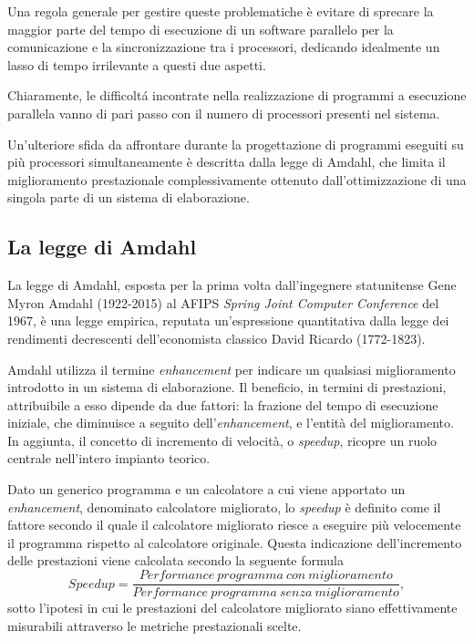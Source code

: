 Una regola generale per gestire queste problematiche \`e evitare di sprecare la maggior parte del tempo di esecuzione di un software parallelo
per la comunicazione e la sincronizzazione tra i processori, dedicando idealmente un lasso di tempo irrilevante a questi due aspetti.

Chiaramente, le difficolt\'a incontrate nella realizzazione di programmi a esecuzione parallela vanno di pari passo con il numero
di processori presenti nel sistema.

Un'ulteriore sfida da affrontare durante la progettazione di programmi eseguiti su pi\`u processori simultaneamente \`e descritta dalla legge di
Amdahl, che limita il miglioramento prestazionale complessivamente ottenuto dall'ottimizzazione di una singola parte di un sistema di
elaborazione.
\subsection{La legge di Amdahl}
La legge di Amdahl, esposta per la prima volta dall’ingegnere statunitense Gene Myron Amdahl (1922-2015) al AFIPS \textit{Spring Joint Computer
    Conference} del 1967, \`e una legge empirica, reputata un'espressione quantitativa dalla legge dei rendimenti decrescenti dell’economista classico David Ricardo (1772-1823).

Amdahl utilizza il termine \textit{enhancement} per indicare un qualsiasi miglioramento introdotto in un sistema di
elaborazione.\newline
Il beneficio, in termini di prestazioni, attribuibile a esso dipende da due fattori: la frazione del tempo di esecuzione iniziale,
che diminuisce a seguito dell'\textit{enhancement}, e l'entit\`a del miglioramento.\newline
In aggiunta, il concetto di incremento di velocit\`a, o \textit{speedup}, ricopre un ruolo centrale nell'intero impianto teorico.

Dato un generico programma e un calcolatore a cui viene apportato un \textit{enhancement}, denominato calcolatore migliorato,
lo \textit{speedup} \`e definito come il fattore secondo il quale il calcolatore migliorato riesce a eseguire pi\`u
velocemente il programma rispetto al calcolatore originale.\newline
Questa indicazione dell'incremento delle prestazioni viene calcolata secondo la seguente formula
\begin{equation*}
    Speedup=\frac{Performance\ programma\ con\ miglioramento}{Performance\ programma\ senza\ miglioramento},
\end{equation*}
sotto l’ipotesi in cui le prestazioni del calcolatore migliorato siano effettivamente misurabili attraverso le metriche
prestazionali scelte.

